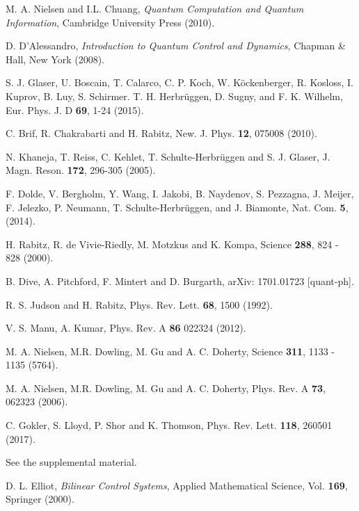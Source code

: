 \documentclass[aps,twocolumn,amsmath,amssymb,nofootinbib,superscriptaddress]{revtex4-1}
\begin{document}

 \begin{thebibliography}{99}
 
 M. A. Nielsen and I.L. Chuang, \textit{Quantum
Computation and Quantum Information}, Cambridge University Press (2010).

 D. D'Alessandro,
\textit{Introduction to Quantum Control and Dynamics}, Chapman \& Hall, New
York (2008).   

 S. J. Glaser, U. Boscain, T. Calarco, C. P. Koch, W. K\"ockenberger, R. Kosloss, I. Kuprov, B. Luy, S. Schirmer. T. H. Herbr\"uggen, D. Sugny, and F. K. Wilhelm, Eur. Phys. J. D \textbf{69}, 1-24 (2015).

C. Brif, R. Chakrabarti and H. Rabitz, New. J. Phys. \textbf{12}, 075008 (2010).



 N. Khaneja, T. Reiss, C.
Kehlet, T. Schulte-Herbr\"uggen and S. J. Glaser, J. Magn. Reson.
\textbf{172}, 296-305 (2005).


 F. Dolde, V. Bergholm, Y. Wang, I. Jakobi, B. Naydenov, S. Pezzagna, J. Meijer, F. Jelezko, P. Neumann, T. Schulte-Herbr\"uggen, and J. Biamonte, Nat. Com. \textbf{5}, (2014).


 H. Rabitz, R. de Vivie-Riedly, M. Motzkus and K. Kompa, Science \textbf{288}, 824 - 828 (2000).  


 B. Dive, A. Pitchford, F. Mintert and D. Burgarth, arXiv: 1701.01723 [quant-ph]. 


 R. S. Judson and H. Rabitz, Phys. Rev. Lett. \textbf{68}, 1500 (1992). 


 V. S. Manu, A. Kumar, Phys. Rev. A \textbf{86} 022324 (2012). 

 M. A. Nielsen, M.R. Dowling, M. Gu and A. C. Doherty, Science \textbf{311}, 1133 - 1135 (5764).

 M. A. Nielsen, M.R. Dowling, M. Gu and A. C. Doherty, Phys. Rev. A \textbf{73}, 062323 (2006). 

 C. Gokler, S. Lloyd, P. Shor and K. Thomson, Phys. Rev. Lett. \textbf{118}, 260501 (2017). 

 See the supplemental material. 

 D. L. Elliot,
\textit{Bilinear Control Systems}, Applied Mathematical Science, Vol. \textbf{169}, Springer (2000). 



\end{thebibliography}
\end{document}
